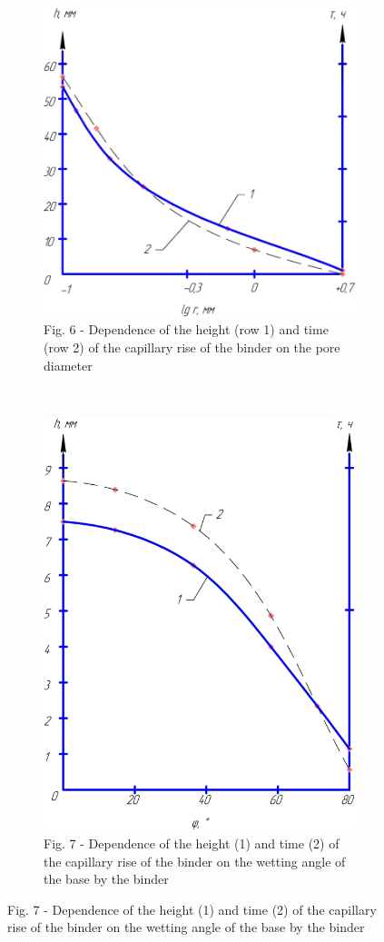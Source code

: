 \begin{figure}[H]
    \centering
    \begin{subfigure}{0.45\textwidth}
        \centering
        \includegraphics[width=\textwidth]{media/gorn2/image9}
        \caption*{Fig. 6 - Dependence of the height (row 1) and time (row 2) of the capillary rise of the binder on the pore diameter}
    \end{subfigure}
    ~
    \begin{subfigure}{0.45\textwidth}
        \centering
        \includegraphics[width=\textwidth, height=\textwidth]{media/gorn2/image10}
        \caption*{Fig. 7 - Dependence of the height (1) and time (2) of the capillary rise of the binder on the wetting angle of the base by the binder}
    \end{subfigure}
\end{figure}

